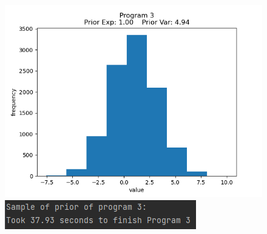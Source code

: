 \documentclass[10pt]{homeworg}
\begin{document}
\begin{figure}[!htbp]
    \centering
    \begin{minipage}{0.45\textwidth}
        \centering
       \includegraphics[scale=0.5]{../figures/program2.png}
    \end{minipage}\hfill
    \begin{minipage}{0.45\textwidth}
        \centering
        \includegraphics[scale=0.8]{../figures/program2_time.png}
    \end{minipage}
\end{figure}

\newpage
\end{document}
